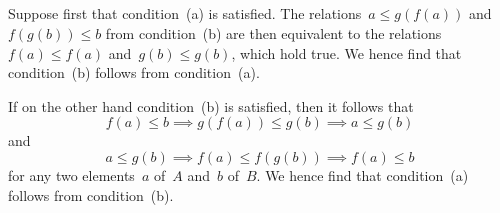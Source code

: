\subsection{}

Suppose first that condition~(a) is satisfied.
The relations~$a ≤ g(f(a))$ and~$f(g(b)) ≤ b$ from condition~(b) are then equivalent to the relations~$f(a) ≤ f(a)$ and~$g(b) ≤ g(b)$, which hold true.
We hence find that condition~(b) follows from condition~(a).

If on the other hand condition~(b) is satisfied, then it follows that
\[
	f(a) ≤ b
	\implies
	g(f(a)) ≤ g(b)
	\implies
	a ≤ g(b)
\]
and
\[
	a ≤ g(b)
	\implies
	f(a) ≤ f(g(b))
	\implies
	f(a) ≤ b
\]
for any two elements~$a$ of~$A$ and~$b$ of~$B$.
We hence find that condition~(a) follows from condition~(b).
